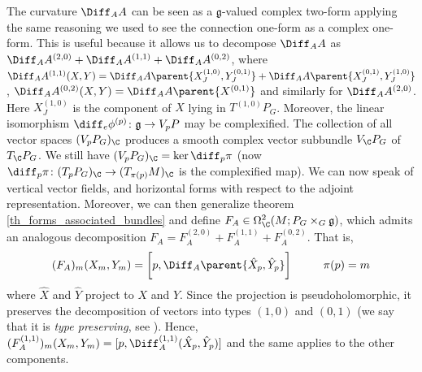 \begin{obs}
    The curvature \(\Diff_AA\) can be seen as a \(\mathfrak{g}\)-valued complex two-form applying the same reasoning we used to see the connection one-form as a complex one-form. This is useful because it allows us to decompose \(\Diff_AA\) as \(\Diff_A A^{(2,0)}+\Diff_A A^{(1,1)}+\Diff_A A^{(0,2)}\), where \(\Diff_A A^{(1,1)}(X,Y)=\Diff_A A\parent{X^{(1,0)}_J,Y^{(0,1)}_J}+\Diff_A A\parent{X_J^{(0,1)}, Y_J^{(1,0)}}\), \(\Diff_A A^{(0,2)}(X,Y)=\Diff_A A\parent{X^{(0,1)}}\) and similarly for \(\Diff_AA^{(2,0)}\). Here \(X_J^{(1,0)}\) is the component of \(X\) lying in \(T^{(1,0)}P_G\). Moreover, the linear isomorphism \(\diff_e \phi^{(p)}\colon \mathfrak{g}\to V_pP\) may be complexified. The collection of all vector spaces \((V_pP_G)_\C\) produces a smooth complex vector subbundle \(V_\C P_G\) of \(T_\C P_G\). We still have \((V_pP_G)_\C=\ker \diff_p\pi\) (now \(\diff_p\pi\colon (T_pP_G)_\C\to (T_{\pi(p)}M)_\C\) is the complexified map). We can now speak of vertical vector fields, and horizontal forms with respect to the adjoint representation. Moreover, we can then generalize theorem \eqref{th_forms_associated_bundles} and define \(F_A \in \Omega_\C^2(M; P_G \times_G \mathfrak{g})\), which admits an analogous decomposition \(F_A=F_A^{(2,0)}+F_A^{(1,1)}+F_A^{(0,2)}\). That is,
    \[
    (F_A)_m(X_m, Y_m)=\bigg[p, \Diff_A\parent{\hat{X}_p, \hat{Y}_p}\bigg] \hspace{1 cm} \pi(p)=m
    \]
    where \(\hat{X}\) and \(\hat{Y}\) project to \(X\) and \(Y\). Since the projection is pseudoholomorphic, it preserves the decomposition of vectors into types \((1,0)\) and \((0,1)\) (we say that it is \textit{type preserving}, see \parencite[Prop. 2.9]{KobayashiNomizu1969Vol2}). Hence, \((F_A^{(1,1)})_m(X_m, Y_m)=[p, \Diff_A^{(1,1)}(\hat{X}_p, \hat{Y}_p)]\) and the same applies to the other components.


\end{obs}
